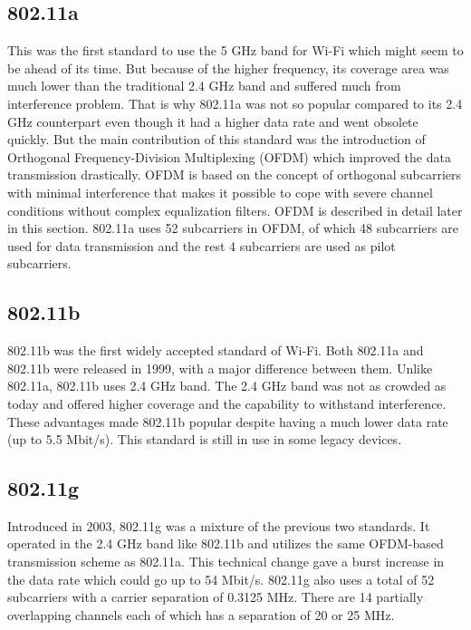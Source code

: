 \subsection{802.11a}
This was the first standard to use the 5 GHz band for Wi-Fi which might seem to be ahead of its time. But because of the higher frequency, its coverage area was much lower than the traditional 2.4 GHz band and suffered much from interference problem. That is why 802.11a was not so popular compared to its 2.4 GHz counterpart even though it had a higher data rate and went obsolete quickly. But the main contribution of this standard was the introduction of Orthogonal Frequency-Division Multiplexing (OFDM) which improved the data transmission drastically. OFDM is based on the concept of orthogonal subcarriers with minimal interference that makes it possible to cope with severe channel conditions without complex equalization filters. OFDM is described in detail later in this section. 802.11a uses 52 subcarriers in OFDM, of which 48 subcarriers are used for data transmission and the rest 4 subcarriers are used as pilot subcarriers.

\subsection{802.11b}
802.11b was the first widely accepted standard of Wi-Fi. Both 802.11a and 802.11b were released in 1999, with a major difference between them. Unlike 802.11a, 802.11b uses 2.4 GHz band. The 2.4 GHz band was not as crowded as today and offered higher coverage and the capability to withstand interference. These advantages made 802.11b popular despite having a much lower data rate (up to 5.5 Mbit/s). This standard is still in use in some legacy devices.

\subsection{802.11g}
Introduced in 2003, 802.11g was a mixture of the previous two standards. It operated in the 2.4 GHz band like 802.11b and utilizes the same OFDM-based transmission scheme as 802.11a. This technical change gave a burst increase in the data rate which could go up to 54 Mbit/s. 802.11g also uses a total of 52 subcarriers with a carrier separation of 0.3125 MHz. There are 14 partially overlapping channels each of which has a separation of 20 or 25 MHz.

